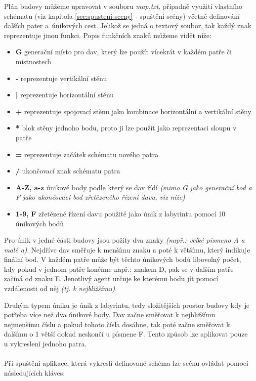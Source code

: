 \documentclass[czech,public,dept460,male,cpdeclaration]{diploma}
\begin{document}
Plán budovy můžeme upravovat v souboru \textit{map.txt}, případně využití vlastního schématu (viz kapitola \ref{sec:spusteni-sceny} - spuštění scény) včetně definování dalších pater a~únikových cest. Jelikož se jedná o textový soubor, tak každý znak reprezentuje jinou funkci. Popis funkčních znaků můžeme vidět níže:

\begin{itemize}
	\item \textbf{G} generační místo pro dav, který lze použít vícekrát v každém patře či místnostech
	\item \textbf{-} reprezentuje vertikální stěnu
	\item \textbf{|} reprezentuje horizontální stěnu
	\item \textbf{+} reprezentuje spojovací stěnu jako kombinace horizontální a vertikální stěny
	\item \textbf{*} blok stěny jednoho bodu, proto ji lze použít jako reprezentaci sloupu v patře
	\item \textbf{=} reprezentuje začátek schématu nového patra
	\item \textbf{/} ukončovací znak schématu patra
	\item \textbf{A-Z, a-z} únikové body podle který se dav řídí \textit{(mimo G jako generační bod a F jako ukončovací bod zřetězeného řízení davu, viz níže)}
	\item \textbf{1-9, F} zřetězené řízení davu použité jako únik z labyrintu pomocí 10 únikových bodů
\end{itemize}

Pro únik v jedné části budovy jsou požity dva znaky \textit{(např.: velké  písmeno A a malé a)}. Nejdříve dav směřuje k menšímu znaku a poté k většímu, který indikuje finální bod. V každém patře může být těchto únikových bodů libovolný počet, kdy pokud v jednom patře končíme např.: znakem D, pak se v dalším patře začíná od znaku E. Jenotlivý agent určuje ke kterému bodu jít pomocí vzdálenosti od něj \textit{(tj. k nejbližšímu)}.

Druhým typem úniku je únik z labyrintu, tedy složitějších prostor budovy kdy je potřeba více než dva únikové body. Dav začne směřovat k nejbližšímu nejmenšímu číslu a pokud tohoto čísla dosáhne, tak poté začne směřovat k dalšímu o 1 větší dokud neskončí u písmene F. Tento způsob lze aplikovat pouze u vykreslení jednoho patra. 
\\\\
Při spuštění aplikace, která vykreslí definované schéma lze scénu ovládat pomocí následujících kláves:
\end{document}
